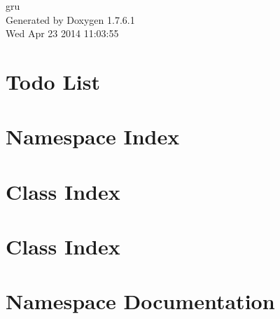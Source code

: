 \documentclass[a4paper]{book}
\begin{document}
\hypersetup{pageanchor=false,citecolor=blue}
\begin{titlepage}
\vspace*{7cm}
\begin{center}
{\Large gru }\\
\vspace*{1cm}
{\large \-Generated by Doxygen 1.7.6.1}\\
\vspace*{0.5cm}
{\small Wed Apr 23 2014 11:03:55}\\
\end{center}
\end{titlepage}
\clearemptydoublepage
{}
\tableofcontents
\clearemptydoublepage
{}
\hypersetup{pageanchor=true,citecolor=blue}
\chapter{\-Todo \-List}
\label{todo}
\hypertarget{todo}{}

\chapter{\-Namespace \-Index}

\chapter{\-Class \-Index}

\chapter{\-Class \-Index}

\chapter{\-Namespace \-Documentation}

\end{document}
